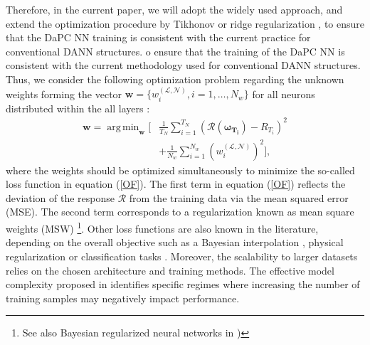 \documentclass[a4paper,fleqn]{article}
\newcommand{\rw}[1]{\textcolor{blue}{#1}}
\newcommand{\del}[1]{\textcolor{red}{\sout{#1}}}
\renewcommand{\del}[1]{}
\renewcommand{\rw}[1]{#1}
\begin{document}
Therefore, in the current paper, we will adopt \del{that popular way} \rw{the widely used approach, and extend the optimization procedure by Tikhonov or ridge regularization \cite{tikhonov1977solutions},} \rw{to ensure that the} \del{in order to make} DaPC NN training \rw{is consistent} \del{comparable} with the current practice for conventional DANN structures.
o ensure that the training of the DaPC NN is consistent with the current methodology used for conventional DANN structures. Thus, we consider the following optimization problem regarding the unknown weights forming the vector \rw{
$\bm{w}=\big\{w^{(\mathcal{L},\mathcal{N})}_{i},i=1,\ldots,N_w \big\}$ for all neurons distributed within the all layers}
: 
%
\begin{equation}
\label{OF}
\begin{aligned}
	 \bm{w} =\operatorname{arg\,min}_{\bm{w}} \biggl[&\frac{1}{T_N}\sum_{i=1}^{T_N} \left( \mathcal{R}(\bm{\omega_{T_i}})-R_{T_i} \right)^2\\ 
	 &+ \frac{1}{N_w}\sum_{i=1}^{N_w} \left(w^{(\mathcal{L},\mathcal{N})}_{i}\right)^2 \biggr],
\end{aligned}
\end{equation}
%
where the weights should be optimized \rw{simultaneously} to minimize the so-called loss function \cite{Goodfellow2016deeplearning} in equation (\ref{OF}). The first term in equation (\ref{OF}) reflects the deviation of the response $\mathcal{R}$ from the training data via the mean squared error (MSE). The second term corresponds to a regularization known as mean square weights (MSW) \footnote{See also Bayesian regularized \rw{neural networks} in \cite{okut2016bayesian})}. Other loss functions are also known in the literature, depending on the overall objective such as a Bayesian interpolation \cite{mackay1992bayesian}, physical regularization \cite{jia2021pgnn,praditia2020thermo} or classification tasks \cite{ballard1982computervision,krizhevsky2017cnn} \del{via cross-entropy between the prediction and the target distribution}. \rw{Moreover, the scalability to larger datasets relies on the chosen architecture and training methods. The effective model complexity proposed in \cite{nakkiran2021deep} identifies specific regimes where increasing the number of training samples may negatively impact performance.}
\end{document}
